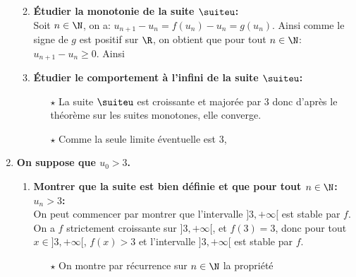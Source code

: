 \documentclass[a4paper, 11pt]{article}
\begin{document}
\begin{correction}
\begin{enumerate}
\begin{enumerate}
\begin{itemize}
\end{itemize}
\item \textbf{\'Etudier la monotonie de la suite $\suiteu$:}\\
\noindent Soit $n\in\N$, on a: $u_{n+1}-u_n=f(u_n)-u_n=g(u_n)$. Ainsi comme le signe de $g$ est positif sur $\R$, on obtient que pour tout $n\in\N$: $u_{n+1}-u_n\geq 0$. Ainsi 
\item \textbf{\'Etudier le comportement \`{a} l'infini de la suite $\suiteu$:}
\begin{itemize}
\item[$\star$] La suite $\suiteu$ est croissante et major\'ee par 3 donc d'apr\`{e}s le th\'eor\`{e}me sur les suites monotones, elle converge.
\item[$\star$] Comme la seule limite \'eventuelle est 3, 
\end{itemize}
\end{enumerate}
\item \textbf{On suppose que $u_0>3$.}
\begin{enumerate}
\item \textbf{Montrer que la suite est bien d\'efinie et que pour tout $n\in\N$: $u_n>3$:}\\
\noindent On peut commencer par montrer que l'intervalle $\rbrack 3,+\infty\lbrack$ est stable par $f$. On a $f$ strictement croissante sur $\rbrack 3,+\infty\lbrack$, et $f(3) = 3$, donc pour tout $x \in \rbrack 3,+\infty\lbrack$, $f(x) >3$ et l'intervalle $\rbrack 3,+\infty\lbrack$ est stable par $f$.
\begin{itemize}
\item[$\star$] On montre par r\'ecurrence sur $n\in\N$ la propri\'et\'e

\end{itemize}
\end{enumerate}
\end{enumerate}
\end{correction}
\end{document}
